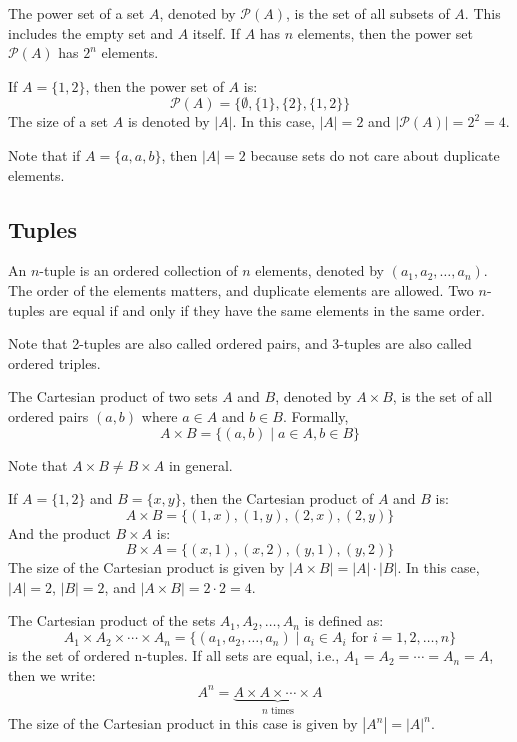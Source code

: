 \begin{definition}
    The power set of a set $A$, denoted by $\mathcal{P}(A)$, is the set of all subsets of $A$. This includes the empty set and $A$ itself. If $A$ has $n$ elements, then the power set $\mathcal{P}(A)$ has $2^n$ elements.
\end{definition}
\begin{eg}
    If $A = \{1, 2\}$, then the power set of $A$ is:
    \[ \mathcal{P}(A) = \{\emptyset, \{1\}, \{2\}, \{1, 2\}\} \]
    The size of a set $A$ is denoted by $|A|$. In this case, $|A| = 2$ and $|\mathcal{P}(A)| = 2^2 = 4$.
\end{eg}
Note that if $A = \{a, a, b\}$, then $|A| = 2$ because sets do not care about duplicate elements.

\subsection{Tuples}
\begin{definition}[Tuple]
    An $n$-tuple is an ordered collection of $n$ elements, denoted by $(a_1, a_2, \ldots, a_n)$. The order of the elements matters, and duplicate elements are allowed. Two $n$-tuples are equal if and only if they have the same elements in the same order.
\end{definition}
Note that 2-tuples are also called ordered pairs, and 3-tuples are also called ordered triples.

\begin{definition}
    The Cartesian product of two sets $A$ and $B$, denoted by $A \times B$, is the set of all ordered pairs $(a, b)$ where $a \in A$ and $b \in B$. Formally,
    \[ A \times B = \{(a, b) \mid a \in A, b \in B\} \]
\end{definition}
Note that $A \times B \neq B \times A$ in general.
\begin{eg}
    If $A = \{1, 2\}$ and $B = \{x, y\}$, then the Cartesian product of $A$ and $B$ is:
    \[ A \times B = \{(1, x), (1, y), (2, x), (2, y)\} \]
    And the product $B \times A$ is:
    \[ B \times A = \{(x, 1), (x, 2), (y, 1), (y, 2)\} \]
    The size of the Cartesian product is given by $|A \times B| = |A| \cdot |B|$. In this case, $|A| = 2$, $|B| = 2$, and $|A \times B| = 2 \cdot 2 = 4$.
\end{eg}
\begin{eg}
    The Cartesian product of the sets $A_1, A_2, \ldots, A_n$ is defined as:
    \[ A_1 \times A_2 \times \cdots \times A_n = \{(a_1, a_2, \ldots, a_n) \mid a_i \in A_i \text{ for } i = 1, 2, \ldots, n\} \]
    is the set of ordered n-tuples. If all sets are equal, i.e., $A_1 = A_2 = \cdots = A_n = A$, then we write:
    \[ A^n = \underbrace{A \times A \times \cdots \times A}_{n \text{ times}} \]
    The size of the Cartesian product in this case is given by $|A^n| = |A|^n$.
\end{eg}


